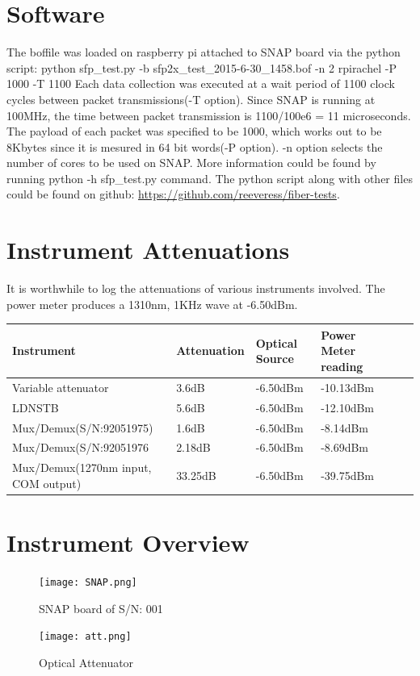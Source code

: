 \documentclass{article}
\begin{document}
\section*{Software}
The boffile was loaded on raspberry pi attached to SNAP board via the python script:
\newline
python sfp\_test.py -b sfp2x\_test\_2015-6-30\_1458.bof -n 2 rpirachel -P 1000 -T 1100
\newline
Each data collection was executed at a wait period of 1100 clock cycles between packet transmissions(-T option). Since SNAP is running at 100MHz, the time between packet transmission is 1100/100e6 = 11 microseconds. The payload of each packet was specified to be 1000, which works out to be 8Kbytes since it is mesured in 64 bit words(-P option). -n option selects the number of cores to be used on SNAP. More information could be found by running python -h sfp\_test.py command. The python script along with other files could be found on github: \url{https://github.com/reeveress/fiber-tests}.

\section*{Instrument Attenuations}

It is worthwhile to log the attenuations of various instruments involved. The power meter produces a 1310nm, 1KHz wave at -6.50dBm. 
\begin{center}
\begin{tabular}{|l|l|l|l|l|p{2cm}|}
	\hline
	Instrument & Attenuation & Optical Source & Power Meter reading\\ \hline
	Variable attenuator & 3.6dB & -6.50dBm & -10.13dBm\\ \hline
	LDNSTB & 5.6dB & -6.50dBm & -12.10dBm \\ \hline
	Mux/Demux(S/N:92051975) & 1.6dB & -6.50dBm & -8.14dBm \\ \hline
	Mux/Demux(S/N:92051976 & 2.18dB & -6.50dBm & -8.69dBm \\ \hline
	Mux/Demux(1270nm input, COM output) & 33.25dB & -6.50dBm & -39.75dBm \\\hline
\end{tabular}	
\end{center}

\section*{Instrument Overview}
\begin{figure}[h!]
\centering
	\begin{minipage}{.4\textwidth}
		\centering
		\texttt{[image: SNAP.png]}
		\caption{SNAP board of S/N: 001} 
	\end{minipage}
	\begin{minipage}{.4\textwidth}
		\centering
		\texttt{[image: att.png]}
		\caption{Optical Attenuator}
	\end{minipage}
\end{figure}
\end{document}
